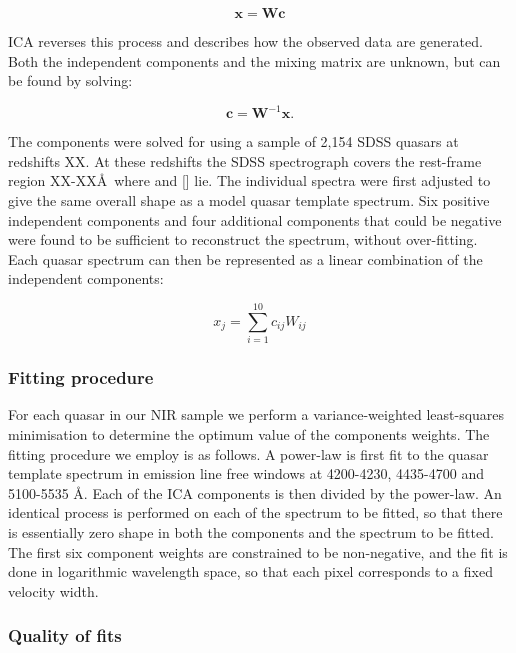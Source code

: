 \begin{equation}
    \bm{x} = \bm{W}\bm{c}
\end{equation}

ICA reverses this process and describes how the observed data are generated. 
Both the independent components and the mixing matrix are unknown, but can be found by solving:

\begin{equation}
    \bm{c} = \bm{W}^{-1}\bm{x}.
\end{equation}

The components were solved for using a sample of 2,154 SDSS quasars at redshifts XX. 
At these redshifts the SDSS spectrograph covers the rest-frame region XX-XX\AA\, where \hb and [] lie. 
The individual spectra were first adjusted to give the same overall shape as a model quasar template spectrum.
Six positive independent components and four additional components that could be negative were found to be sufficient to reconstruct the spectrum, without over-fitting. 
Each quasar spectrum can then be represented as a linear combination of the independent components: 

\begin{equation}
    x_j = \sum_{i=1}^{10} c_{ij}W_{ij}
\end{equation}

\subsubsection{Fitting procedure}

For each quasar in our NIR sample we perform a variance-weighted least-squares minimisation to determine the optimum value of the components weights.
The fitting procedure we employ is as follows. 
A power-law is first fit to the quasar template spectrum in emission line free windows at 4200-4230, 4435-4700 and 5100-5535 \AA. 
Each of the ICA components is then divided by the power-law. 
An identical process is performed on each of the spectrum to be fitted, so that there is essentially zero shape in both the components and the spectrum to be fitted. 
The first six component weights are constrained to be non-negative, and the fit is done in logarithmic wavelength space, so that each pixel corresponds to a fixed velocity width.   

\subsubsection{Quality of fits}


